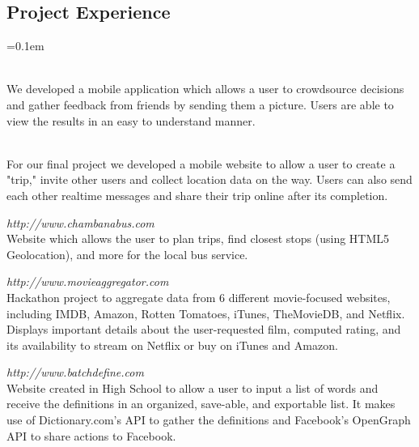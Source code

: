 \documentclass[10pt,letterpaper]{article}
\begin{document}
\subsection*{Project Experience}
\begin{description}[leftmargin=0pt]
	\parskip=0.1em
      
      \item[CS 465 Final Project]\hfill\\
      We developed a mobile application which allows a user to crowdsource 
      decisions and gather feedback from friends by sending them a picture. 
      Users are able to view the results in an easy to understand manner.
      
      \item[CS 498STK Final Project]\hfill\\
      For our final project we developed a mobile website to allow a user to 
      create a "trip," invite other users and collect location data on the way. 
      Users can also send each other realtime messages and share their 
      trip online after its completion.
      
	\item[Chambana Bus] {\emph{http://www.chambanabus.com}}\hfill\\
      Website which allows the user to plan trips, find closest stops (using HTML5 
	Geolocation), and more for the local bus service.

	\item[MovieAggregator] {\emph{http://www.movieaggregator.com}}\hfill\\
      Hackathon project to aggregate data from 6 different movie-focused 
      websites, including IMDB, Amazon, Rotten Tomatoes, iTunes, TheMovieDB, and 
      Netflix. Displays important details about the user-requested film, 
      computed rating, and its availability to stream on Netflix or buy on 
      iTunes and Amazon.

	\item[BatchDefine] {\emph{http://www.batchdefine.com}}\hfill\\
      Website created in High School to allow a user to input a list of words 
      and receive the definitions in an organized, save-able, and exportable list. 
      It makes use of Dictionary.com's API to gather the definitions and 
      Facebook's OpenGraph API to share actions to Facebook.

	
\end{description}
\end{document}
